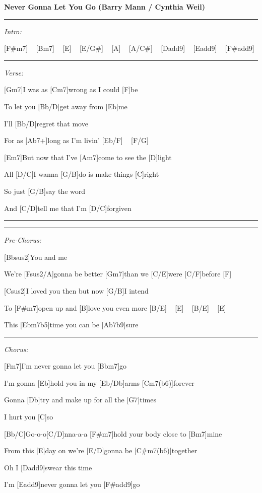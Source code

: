 


\begin{guitar}
\textbf{Never Gonna Let You Go (Barry Mann / Cynthia Weil)}

\hrule

\emph{Intro:}

[F#m7] ~ [Bm7] ~ [E] ~ [E/G#] ~ [A] ~ [A/C#] ~ [Dadd9] ~ [Eadd9] ~ [F#add9]

\hrule

\emph{Verse:}

[Gm7]I was as [Cm7]wrong as I could [F]be

To let you [Bb/D]get away from [Eb]me

I'll [Bb/D]regret that move

For as [Ab7+]long as I'm livin' [Eb/F] ~ [F/G] ~



[Em7]But now that I've [Am7]come to see the [D]light

All [D/C]I wanna [G/B]do is make things [C]right

So just [G/B]say the word

And [C/D]tell me that I'm [D/C]forgiven

\hrule
\pagebreak
\hrule

\emph{Pre-Chorus:}

[Bbsus2]You and me

We're [Fsus2/A]gonna be better [Gm7]than we [C/E]were [C/F]before [F] ~

[Csus2]I loved you then but now [G/B]I intend

To [F#m7]open up and [B]love you even more [B/E] ~ [E] ~ [B/E] ~ [E] ~

This [Ebm7b5]time you can be [Ab7b9]sure

\hrule

\emph{Chorus:}

[Fm7]I'm never gonna let you [Bbm7]go

I'm gonna [Eb]hold you in my [Eb/Db]arms [Cm7(b6)]forever

Gonna [Db]try and make up for all the [G7]times

I hurt you [C]so

[Bb/C]Go-o-o[C/D]nna-a-a [F#m7]hold your body close to [Bm7]mine

From this [E]day on we're [E/D]gonna be [C#m7(b6)]together

Oh I [Dadd9]swear this time

I'm [Eadd9]never gonna let you [F#add9]go


\end{guitar}
